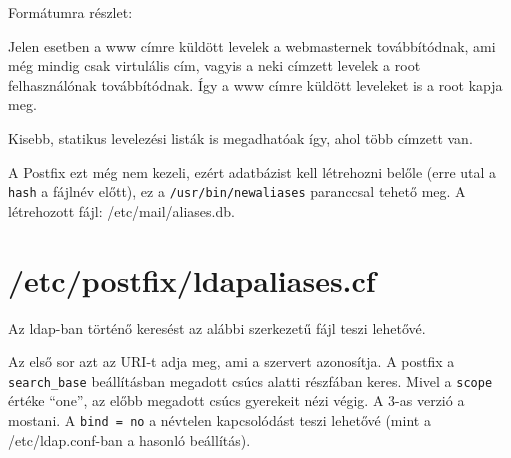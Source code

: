 Formátumra részlet:\\

Jelen esetben a www címre küldött levelek a webmasternek továbbítódnak, ami még mindig csak virtulális cím, vagyis a
neki címzett levelek a root felhasználónak továbbítódnak. Így a www címre küldött leveleket is a root kapja meg.

Kisebb, statikus levelezési listák is megadhatóak így, ahol több címzett van.

A Postfix ezt még nem kezeli, ezért adatbázist kell létrehozni belőle (erre utal a \texttt{hash} a fájlnév előtt), ez
a \texttt{/usr/bin/newaliases} paranccsal tehető meg. A létrehozott fájl: /etc/mail/aliases.db.



\section{/etc/postfix/ldapaliases.cf}
Az ldap-ban történő keresést az alábbi szerkezetű fájl teszi lehetővé.


Az első sor azt az URI-t adja meg, ami a szervert azonosítja. A postfix a \texttt{search\_base} beállításban megadott
csúcs alatti részfában keres. Mivel a \texttt{scope} értéke ``one'', az előbb megadott csúcs gyerekeit nézi végig. A
3-as verzió  a mostani. A \texttt{bind = no} a névtelen kapcsolódást teszi lehetővé (mint a /etc/ldap.conf-ban a
hasonló beállítás).

